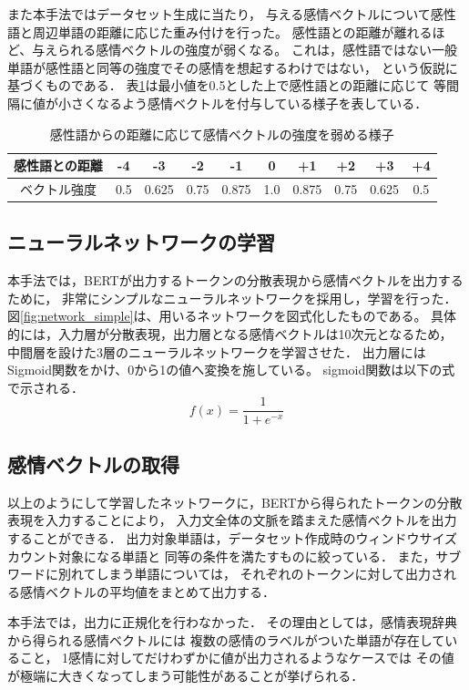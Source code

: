 			また本手法ではデータセット生成に当たり，
			与える感情ベクトルについて感性語と周辺単語の距離に応じた重み付けを行った。
			感性語との距離が離れるほど、与えられる感情ベクトルの強度が弱くなる。
			これは，感性語ではない一般単語が感性語と同等の強度でその感情を想起するわけではない，
			という仮説に基づくものである．
			表\ref{table:vector_weaken}は最小値を0.5とした上で感性語との距離に応じて
			等間隔に値が小さくなるよう感情ベクトルを付与している様子を表している．
			\begin{table}[H]
				\centering
				\caption{感性語からの距離に応じて感情ベクトルの強度を弱める様子}
				\label{table:vector_weaken}
					\begin{tabular}{cccccccccc}
						\hline
						感性語との距離 & -4 & -3 & -2 & -1 & 0 & +1 & +2 & +3 & +4 \\
						\hline
						ベクトル強度 & 0.5 & 0.625 & 0.75 & 0.875 & 1.0 & 0.875 & 0.75 & 0.625 & 0.5 \\
						\hline
					\end{tabular}
			\end{table}

		\subsection{ニューラルネットワークの学習}
			本手法では，BERTが出力するトークンの分散表現から感情ベクトルを出力するために，
			非常にシンプルなニューラルネットワークを採用し，学習を行った．
			図\ref{fig:network_simple}は、用いるネットワークを図式化したものである。
			具体的には，入力層が分散表現，出力層となる感情ベクトルは10次元となるため，
			中間層を設けた3層のニューラルネットワークを学習させた．
			出力層にはSigmoid関数をかけ、0から1の値へ変換を施している。
			sigmoid関数は以下の式で示される．
			\begin{equation}
				f(x)=\frac{1}{1+e^{-x}}
			\end{equation}

		\subsection{感情ベクトルの取得}
			以上のようにして学習したネットワークに，BERTから得られたトークンの分散表現を入力することにより，
			入力文全体の文脈を踏まえた感情ベクトルを出力することができる．
			出力対象単語は，データセット作成時のウィンドウサイズカウント対象になる単語と
			同等の条件を満たすものに絞っている．
			また，サブワードに別れてしまう単語については，
			それぞれのトークンに対して出力される感情ベクトルの平均値をまとめて出力する．

			本手法では，出力に正規化を行わなかった．
			その理由としては，感情表現辞典から得られる感情ベクトルには
			複数の感情のラベルがついた単語が存在していること，
			1感情に対してだけわずかに値が出力されるようなケースでは
			その値が極端に大きくなってしまう可能性があることが挙げられる．
